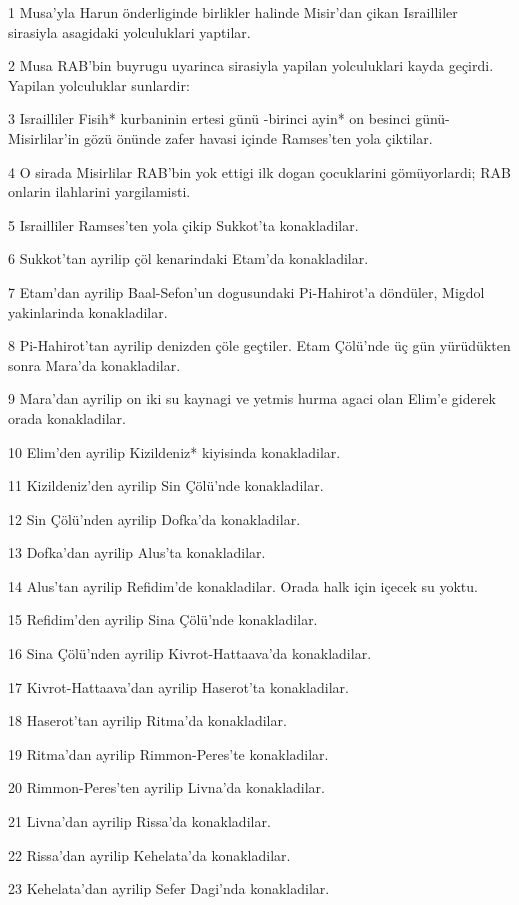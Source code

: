 \par 1 Musa'yla Harun önderliginde birlikler halinde Misir'dan çikan Israilliler sirasiyla asagidaki yolculuklari yaptilar.
\par 2 Musa RAB'bin buyrugu uyarinca sirasiyla yapilan yolculuklari kayda geçirdi. Yapilan yolculuklar sunlardir:
\par 3 Israilliler Fisih* kurbaninin ertesi günü -birinci ayin* on besinci günü- Misirlilar'in gözü önünde zafer havasi içinde Ramses'ten yola çiktilar.
\par 4 O sirada Misirlilar RAB'bin yok ettigi ilk dogan çocuklarini gömüyorlardi; RAB onlarin ilahlarini yargilamisti.
\par 5 Israilliler Ramses'ten yola çikip Sukkot'ta konakladilar.
\par 6 Sukkot'tan ayrilip çöl kenarindaki Etam'da konakladilar.
\par 7 Etam'dan ayrilip Baal-Sefon'un dogusundaki Pi-Hahirot'a döndüler, Migdol yakinlarinda konakladilar.
\par 8 Pi-Hahirot'tan ayrilip denizden çöle geçtiler. Etam Çölü'nde üç gün yürüdükten sonra Mara'da konakladilar.
\par 9 Mara'dan ayrilip on iki su kaynagi ve yetmis hurma agaci olan Elim'e giderek orada konakladilar.
\par 10 Elim'den ayrilip Kizildeniz* kiyisinda konakladilar.
\par 11 Kizildeniz'den ayrilip Sin Çölü'nde konakladilar.
\par 12 Sin Çölü'nden ayrilip Dofka'da konakladilar.
\par 13 Dofka'dan ayrilip Alus'ta konakladilar.
\par 14 Alus'tan ayrilip Refidim'de konakladilar. Orada halk için içecek su yoktu.
\par 15 Refidim'den ayrilip Sina Çölü'nde konakladilar.
\par 16 Sina Çölü'nden ayrilip Kivrot-Hattaava'da konakladilar.
\par 17 Kivrot-Hattaava'dan ayrilip Haserot'ta konakladilar.
\par 18 Haserot'tan ayrilip Ritma'da konakladilar.
\par 19 Ritma'dan ayrilip Rimmon-Peres'te konakladilar.
\par 20 Rimmon-Peres'ten ayrilip Livna'da konakladilar.
\par 21 Livna'dan ayrilip Rissa'da konakladilar.
\par 22 Rissa'dan ayrilip Kehelata'da konakladilar.
\par 23 Kehelata'dan ayrilip Sefer Dagi'nda konakladilar.
